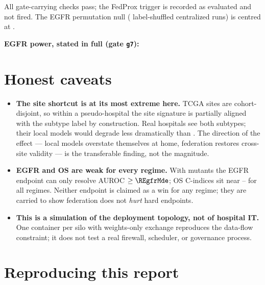 \documentclass[11pt,a4paper]{article}
\begin{document}
All \RNGatesPass{} gate-carrying checks pass; the FedProx trigger is recorded as evaluated and
not fired. The EGFR permutation null (\RPermNullN{} label-shuffled centralized runs) is centred
at \RPermNullMean.

\begin{center}
\small

\end{center}

\noindent\textbf{EGFR power, stated in full (gate \texttt{g7}):} 

\section{Honest caveats}

\begin{itemize}[leftmargin=1.2em,itemsep=2pt]
\item \textbf{The site shortcut is at its most extreme here.} TCGA sites are cohort-disjoint,
so within a pseudo-hospital the site signature is partially aligned with the subtype label by
construction. Real hospitals see both subtypes; their local models would degrade less
dramatically than \RSubtypeOffdiagWorst. The direction of the effect --- local models
overstate themselves at home, federation restores cross-site validity --- is the transferable
finding, not the magnitude.
\item \textbf{EGFR and OS are weak for every regime.} With \REgfrMutants{} mutants the EGFR
endpoint can only resolve AUROC $\geq \REgfrMde$; OS C-indices sit near
\ROsCentralMean{}--\ROsFedavgMean{} for all regimes. Neither endpoint is claimed as a win for
any regime; they are carried to show federation does not \emph{hurt} hard endpoints.
\item \textbf{This is a simulation of the deployment topology, not of hospital IT.} One
container per silo with weights-only exchange reproduces the data-flow constraint; it does not
test a real firewall, scheduler, or governance process.
\end{itemize}

\section{Reproducing this report}
\end{document}
